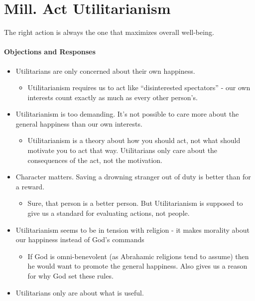 \documentclass[12pt]{article}
\begin{document}
\section{Mill. Act Utilitarianism}

The right action is always the one that maximizes overall well-being.

\paragraph{Objections and Responses}
\begin{itemize}
    \item Utilitarians are only concerned about their own happiness.
          \begin{itemize}
              \item Utilitarianism requires us to act like ``disinterested spectators'' - our own interests count exactly as much as every other person's.
          \end{itemize}
    \item Utilitarianism is too demanding. It's not possible to care more about the general happiness than our own interests.
          \begin{itemize}
              \item Utilitarianism is a theory about how you should act, not what should motivate you to act that way. Utilitarians only care about the consequences of the act, not the motivation.
          \end{itemize}
    \item Character matters. Saving a drowning stranger out of duty is better than for a reward.
          \begin{itemize}
              \item Sure, that person is a better person. But Utilitarianism is supposed to give us a standard for evaluating actions, not people.
          \end{itemize}
    \item Utilitarianism seems to be in tension with religion - it makes morality about our happiness instead of God's commands
          \begin{itemize}
              \item If God is omni-benevolent (as Abrahamic religions tend to assume) then he would want to promote the general happiness. Also gives us a reason for why God set these rules.
          \end{itemize}
    \item Utilitarians only are about what is useful.

\end{itemize}
\end{document}
